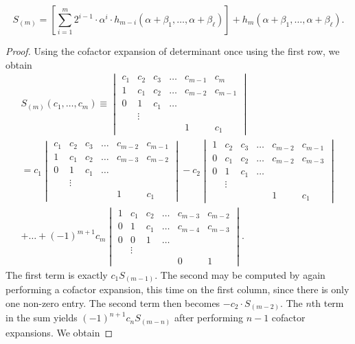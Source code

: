 \documentclass[10pt,a4paper]{amsart}
\begin{document}
\begin{lemma}\label{Sm determinant}
\[
S_{(m)}=\left[\sum_{i=1}^{m}2^{i-1}\cdot \alpha^i\cdot h_{m-i}(\alpha+\beta_1,\dots,\alpha+\beta_\ell)\right] + h_{m}(\alpha+\beta_1,\dots,\alpha+\beta_\ell).
\]
\end{lemma}

\begin{proof}
Using the cofactor expansion of determinant once using the first row, we obtain 
\begin{gather*}
S_{(m)}(c_1,\dots,c_m) \equiv \begin{vmatrix}c_1 & c_2 & c_3&\dots&c_{m-1} & c_{m}\\ 1 & c_1 &c_2& \dots&c_{m-2} & c_{m-1}\\0&1&c_1&\dots\\ & \vdots & \\
&&&&1&c_1\end{vmatrix}\\
=c_1\begin{vmatrix}c_1 & c_2 &c_3& \dots&c_{m-2} & c_{m-1}\\ 1 & c_1 & c_2&\dots&c_{m-3} & c_{m-2}\\0&1&c_1&\dots\\ & \vdots & \\
&&&&1&c_1\end{vmatrix}-c_2\begin{vmatrix}1 & c_2 & c_3 &\dots&c_{m-2} & c_{m-1}\\ 0& c_1 & c_2 & \dots&c_{m-2} & c_{m-3}\\0&1&c_1&\dots\\ & \vdots & \\
&&&&1&c_1\end{vmatrix} \\
+ \dots + (-1)^{m+1}c_m\begin{vmatrix}1 & c_1 & c_2 &\dots&c_{m-3} & c_{m-2}\\ 0& 1 & c_1 & \dots&c_{m-4} & c_{m-3}\\0&0&1&\dots\\ & \vdots & \\
&&&&0&1\end{vmatrix}.
\end{gather*}
The first term is exactly $c_1S_{(m-1)}$. The second may be computed by again performing a cofactor expansion, this time on the first column, since there is only one non-zero entry. The second term then becomes $-c_2\cdot S_{(m-2)}$. The $n$th term in the sum yields $(-1)^{n+1}c_nS_{(m-n)}$ after performing $n-1$ cofactor expansions. We obtain

\end{proof}
\end{document}
